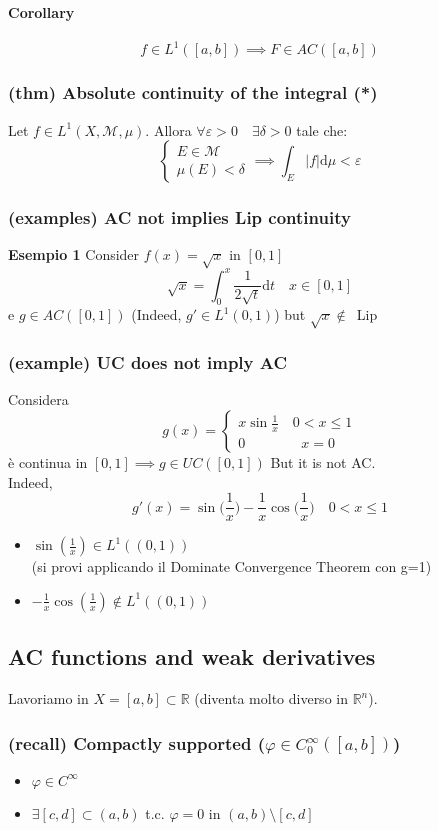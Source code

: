 \paragraph{Corollary}
$$f\in L^1([a,b])\implies F\in AC([a,b])$$
\subsubsection{(thm) Absolute continuity of the integral (*)}
Let $f\in L^1(X,\mathcal M,\mu)$. Allora $\forall \varepsilon>0\quad \exists \delta>0$ tale che:
$$\begin{cases}
    E\in \mathcal M\\\mu(E)<\delta
\end{cases}\implies \int_E |f| \mathrm d \mu<\varepsilon$$
\subsubsection{(examples) AC not implies Lip continuity}
\textbf{Esempio 1}
Consider $f(x)=\sqrt x $ in $[0,1]$
$$\sqrt x = \int _0^x \frac 1{2\sqrt t }\mathrm dt\quad x\in [0,1]$$
e $g\in AC([0,1])$ (Indeed, $g'\in L^1(0,1)$) 
but $\sqrt{x}\notin $\ Lip\\
\subsubsection{(example) UC does not imply AC}
Considera $$g(x)=\begin{cases}x \sin\frac 1x\quad 0<x\leq 1\\0\quad\quad\quad\quad x=0\end{cases}$$
è continua in $[0,1]\implies g\in UC([0,1])$
But it is not AC.\\
Indeed,
$$ g'(x)=\sin \Big(\frac 1x\Big)-\frac 1x \cos\Big(\frac 1x\Big)\quad 0<x\leq 1$$
\begin{itemize}
    \item $\sin (\frac 1x)\in L^1((0,1))$\\ (si provi applicando il Dominate Convergence Theorem con g=1)
    \item $-\frac 1x \cos(\frac 1x) \notin L^1((0,1))$
\end{itemize}

\subsection{AC functions and weak derivatives}
Lavoriamo in $X=[a,b]\subset \mathbb R$ (diventa molto diverso in $\mathbb R^n$).
\subsubsection{(recall) Compactly supported ($\varphi \in C_0^\infty([a,b])$)}
\begin{itemize}
    \item $\varphi \in C^\infty$
    \item $\exists [c,d]\subset (a,b)$ t.c. $\varphi=0 $ in $ (a,b)\setminus [c,d]$
\end{itemize}
